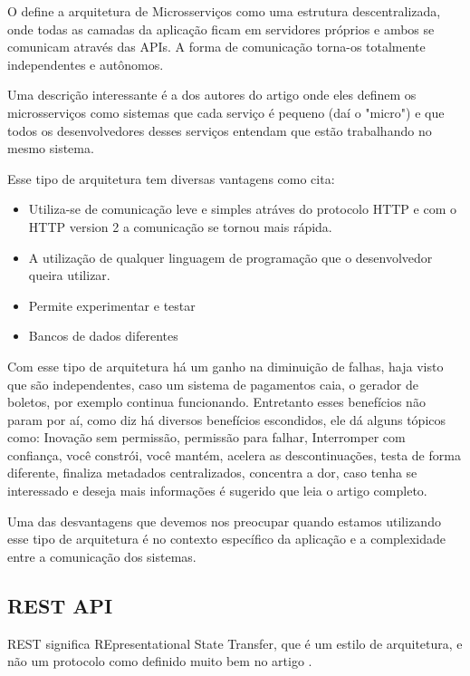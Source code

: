 O \cite{Batista2018} define a arquitetura de Microsserviços como uma estrutura descentralizada, onde todas as camadas da aplicação ficam em servidores próprios e ambos se comunicam através das APIs. A forma de comunicação torna-os totalmente independentes e autônomos.

Uma descrição interessante é a dos autores do artigo \cite{Zhu2016} onde eles definem os microsserviços como sistemas que cada serviço é pequeno (daí o "micro") e que todos os desenvolvedores desses serviços entendam que estão trabalhando no mesmo sistema.

Esse tipo de arquitetura tem diversas vantagens como \cite{Batista2018} cita: 

\begin{itemize}
    \item Utiliza-se de comunicação leve e simples atráves do protocolo HTTP e com o HTTP version 2 a comunicação se tornou mais rápida.
    \item A utilização de qualquer linguagem de programação que o desenvolvedor queira utilizar.
    \item Permite experimentar e testar
    \item Bancos de dados diferentes
\end{itemize}

Com esse tipo de arquitetura há um ganho na diminuição de falhas, haja visto que são independentes, caso um sistema de pagamentos caia, o gerador de boletos, por exemplo continua funcionando. 
Entretanto esses benefícios não param por aí, como diz \cite{Tom2016} há diversos benefícios escondidos, ele dá alguns tópicos como: Inovação sem permissão, permissão para falhar, Interromper com confiança, você constrói, você mantém, acelera as descontinuações, testa de forma diferente, finaliza metadados centralizados, concentra a dor, caso tenha se interessado e deseja mais informações é sugerido que leia o artigo completo.

Uma das desvantagens que devemos nos preocupar quando estamos utilizando esse tipo de arquitetura é no contexto específico da aplicação e a complexidade entre a comunicação dos sistemas.


\subsection{ REST API}

REST significa REpresentational State Transfer, que é um estilo de arquitetura, e não um protocolo como definido muito bem no artigo \cite{Harber2019}.

